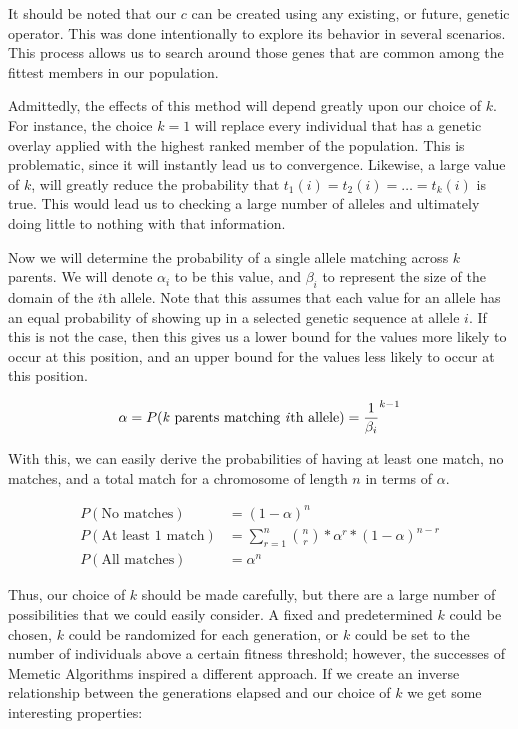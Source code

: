 It should be noted that our $c$ can be created using any existing, or future, genetic operator. This was done intentionally to explore its behavior in several scenarios. This process allows us to search around those genes that are common among the fittest members in our population. 

Admittedly, the effects of this method will depend greatly upon our choice of $k$. For instance, the choice $k = 1$ will replace every individual that has a genetic overlay applied with the highest ranked member of the population. This is problematic, since it will instantly lead us to convergence. Likewise, a large value of $k$, will greatly reduce the probability that $t_1(i) = t_2(i) = \ldots = t_k(i)$ is true. This would lead us to checking a large number of alleles and ultimately doing little to nothing with that information.

Now we will determine the probability of a single allele matching across $k$ parents. We will denote $\alpha_i$ to be this value, and $\beta_i$ to represent the size of the domain of the $i$th allele. Note that this assumes that each value for an allele has an equal probability of showing up in a selected genetic sequence at allele $i$. If this is not the case, then this gives us a lower bound for the values more likely to occur at this position, and an upper bound for the values less likely to occur at this position.

\[ \alpha = P(\text{\emph{k} parents matching \emph{i}th allele}) = \frac{1}{\beta_i}^{k-1} \]

With this, we can easily derive the probabilities of having at least one match, no matches, and a total match for a chromosome of length $n$ in terms of $\alpha$.

\begin{align*}
P( \text{No matches})&= (1 - \alpha)^n \\
P( \text{At least }1 \text{ match}) &=\sum\limits^{n}_{r=1} \binom{n}{r}*\alpha^{r}*(1-\alpha)^{n-r} \\
P( \text{All matches})&= \alpha^n
\end{align*}

Thus, our choice of $k$ should be made carefully, but there are a large number of possibilities that we could easily consider. A fixed and predetermined $k$ could be chosen, $k$ could be randomized for each generation, or $k$ could be set to the number of individuals above a certain fitness threshold; however, the successes of Memetic Algorithms inspired a different approach. If we create an inverse relationship between the generations elapsed and our choice of $k$ we get some interesting properties:

